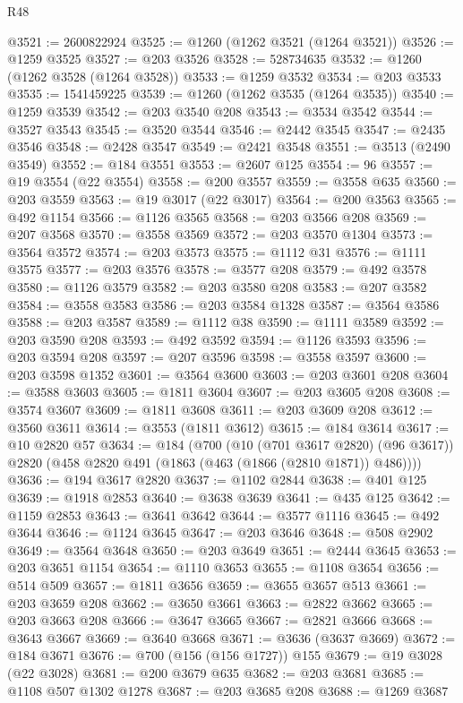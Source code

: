 \begin{lexlean}{R48}
\begin{coremodule}
@3521 := 2600822924
@3525 := @1260 (@1262 @3521 (@1264 @3521))
@3526 := @1259 @3525
@3527 := @203 @3526
@3528 := 528734635
@3532 := @1260 (@1262 @3528 (@1264 @3528))
@3533 := @1259 @3532
@3534 := @203 @3533
@3535 := 1541459225
@3539 := @1260 (@1262 @3535 (@1264 @3535))
@3540 := @1259 @3539
@3542 := @203 @3540 @208
@3543 := @3534 @3542
@3544 := @3527 @3543
@3545 := @3520 @3544
@3546 := @2442 @3545
@3547 := @2435 @3546
@3548 := @2428 @3547
@3549 := @2421 @3548
@3551 := @3513 (@2490 @3549)
@3552 := @184 @3551
@3553 := @2607 @125
@3554 := 96
@3557 := @19 @3554 (@22 @3554)
@3558 := @200 @3557
@3559 := @3558 @635
@3560 := @203 @3559
@3563 := @19 @3017 (@22 @3017)
@3564 := @200 @3563
@3565 := @492 @1154
@3566 := @1126 @3565
@3568 := @203 @3566 @208
@3569 := @207 @3568
@3570 := @3558 @3569
@3572 := @203 @3570 @1304
@3573 := @3564 @3572
@3574 := @203 @3573
@3575 := @1112 @31
@3576 := @1111 @3575
@3577 := @203 @3576
@3578 := @3577 @208
@3579 := @492 @3578
@3580 := @1126 @3579
@3582 := @203 @3580 @208
@3583 := @207 @3582
@3584 := @3558 @3583
@3586 := @203 @3584 @1328
@3587 := @3564 @3586
@3588 := @203 @3587
@3589 := @1112 @38
@3590 := @1111 @3589
@3592 := @203 @3590 @208
@3593 := @492 @3592
@3594 := @1126 @3593
@3596 := @203 @3594 @208
@3597 := @207 @3596
@3598 := @3558 @3597
@3600 := @203 @3598 @1352
@3601 := @3564 @3600
@3603 := @203 @3601 @208
@3604 := @3588 @3603
@3605 := @1811 @3604
@3607 := @203 @3605 @208
@3608 := @3574 @3607
@3609 := @1811 @3608
@3611 := @203 @3609 @208
@3612 := @3560 @3611
@3614 := @3553 (@1811 @3612)
@3615 := @184 @3614
@3617 := @10 @2820 @57
@3634 := @184
    (@700
      (@10 (@701 @3617 @2820) (@96 @3617))
      @2820
      (@458 @2820 @491 (@1863 (@463 (@1866 (@2810 @1871)) @486))))
@3636 := @194 @3617 @2820
@3637 := @1102 @2844
@3638 := @401 @125
@3639 := @1918 @2853
@3640 := @3638 @3639
@3641 := @435 @125
@3642 := @1159 @2853
@3643 := @3641 @3642
@3644 := @3577 @1116
@3645 := @492 @3644
@3646 := @1124 @3645
@3647 := @203 @3646
@3648 := @508 @2902
@3649 := @3564 @3648
@3650 := @203 @3649
@3651 := @2444 @3645
@3653 := @203 @3651 @1154
@3654 := @1110 @3653
@3655 := @1108 @3654
@3656 := @514 @509
@3657 := @1811 @3656
@3659 := @3655 @3657 @513
@3661 := @203 @3659 @208
@3662 := @3650 @3661
@3663 := @2822 @3662
@3665 := @203 @3663 @208
@3666 := @3647 @3665
@3667 := @2821 @3666
@3668 := @3643 @3667
@3669 := @3640 @3668
@3671 := @3636 (@3637 @3669)
@3672 := @184 @3671
@3676 := @700 (@156 (@156 @1727)) @155
@3679 := @19 @3028 (@22 @3028)
@3681 := @200 @3679 @635
@3682 := @203 @3681
@3685 := @1108 @507 @1302 @1278
@3687 := @203 @3685 @208
@3688 := @1269 @3687

\end{coremodule}
\end{lexlean}
